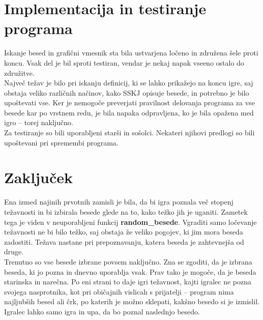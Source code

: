 \documentclass [a4paper, 12pt] {article}
\begin{document}
\section {Implementacija in testiranje programa}
Iskanje besed in grafični vmesnik sta bila ustvarjena ločeno in združena šele proti koncu. Vsak del je bil sproti testiran, vendar je nekaj napak vseeno ostalo do združitve. \\
Največ težav je bilo pri iskanju definicij, ki se lahko prikažejo na koncu igre, saj obstaja veliko različnih načinov, kako SSKJ opisuje besede, in potrebno je bilo upoštevati vse. Ker je nemogoče preverjati pravilnost delovanja programa za vse besede kar po vrstnem redu, je bila napaka odpravljena, ko je bila opažena med igro -- torej naključno. \\
Za testiranje so bili uporabljeni starši in sošolci. Nekateri njihovi predlogi so bili upoštevani pri spremembi programa.

\section {Zaključek}
Ena izmed najinih prvotnih zamisli je bila, da bi igra poznala več stopenj težavnosti in bi izbirala besede glede na to, kako težko jih je uganiti. Zametek tega je viden v neuporabljeni funkcij \textbf {random\_besede}. Vgraditi samo ločevanje težavnosti ne bi bilo težko, saj obstaja že veliko pogojev, ki jim mora beseda zadostiti. Težava nastane pri prepoznavanju, katera beseda je zahtevnejša od druge. \\
Trenutno so vse besede izbrane povsem naključno. Zna se zgoditi, da je izbrana beseda, ki jo pozna in dnevno uporablja vsak. Prav tako je mogoče, da je beseda starinska in narečna. Po eni strani to daje igri težavnost, kajti igralec ne pozna svojega nasprotnika, kot pri običajnih vislicah s prijatelji -- program nima najljubših besed ali črk, po katerih je možno sklepati, kakšno besedo si je izmislil. Igralec lahko samo igra in upa, da bo poznal naslednjo besedo. 
\end{document}
